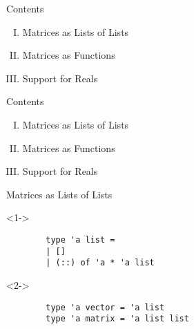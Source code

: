 \documentclass[handout]{beamer}
\begin{document}
\begin{frame}{Contents}
	\begin{enumerate}[I.]
		\item<1-> Matrices as Lists of Lists
		\item<2-> Matrices as Functions
		\item<3-> Support for Reals
	\end{enumerate}
\end{frame}


\begin{frame}{Contents}
	\begin{enumerate}[I.]
		\item<1> Matrices as Lists of Lists
		\item<0> Matrices as Functions
		\item<0> Support for Reals
	\end{enumerate}
\end{frame}

\begin{frame}[fragile]{Matrices as Lists of Lists}
	\begin{onlyenv}<1->
	\begin{lstlisting}
		type 'a list =
		| []
		| (::) of 'a * 'a list
	\end{lstlisting}
	\end{onlyenv}
	
	\begin{onlyenv}<2->
	\begin{lstlisting}
		type 'a vector = 'a list
		type 'a matrix = 'a list list
	\end{lstlisting}
	\end{onlyenv}
\end{frame}

\end{document}

